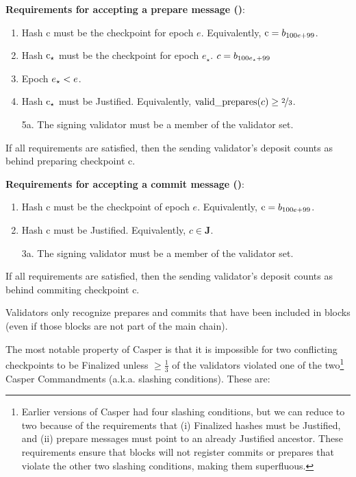 \documentclass[12pt]{article}
\newcommand{\epoch}{\ensuremath{e}\xspace}
\newcommand{\hash}{\textnormal{c}\xspace}
\newcommand{\epochsource}{\ensuremath{\epoch_{\star}}\space}
\newcommand{\hashsource}{\ensuremath{\hash_{\star}}\xspace}
\newcommand{\msgCOMMIT}{\textbf{\textsc{commit}}\xspace}
\begin{document}

\textbf{Requirements for accepting a prepare message ()}:
\begin{enumerate}
\item Hash \hash must be the checkpoint for epoch \epoch.  Equivalently, $\hash = b_{100\epoch + 99}$.
\item Hash \hashsource must be the checkpoint for epoch \epochsource.  $c = b_{100\epochsource + 99}$
\item Epoch $\epochsource < \epoch$.
\item Hash \hashsource must be Justified.  Equivalently, $\textnormal{valid\_prepares}(c) \geq \nicefrac{2}{3}$.
\item[5a.] The signing validator must be a member of the validator set.
\end{enumerate}
If all requirements are satisfied, then the sending validator's deposit counts as behind preparing checkpoint \hash.




\textbf{Requirements for accepting a commit message ()}:
\begin{enumerate}
\item Hash \hash must be the checkpoint of epoch \epoch.  Equivalently, $\hash = b_{100\epoch + 99}$.
\item Hash \hash must be Justified.  Equivalently, $c \in \mathbf{J}$.
\item[3a.] The signing validator must be a member of the validator set.
\end{enumerate}
If all requirements are satisfied, then the sending validator's deposit counts as behind commiting checkpoint \hash.

Validators only recognize prepares and commits that have been included in blocks (even if those blocks are not part of the main chain). 

The most notable property of Casper is that it is impossible for two conflicting checkpoints to be Finalized unless $\geq \frac{1}{3}$ of the validators violated one of the two\footnote{Earlier versions of Casper had four slashing conditions,\cite{minslashing} but we can reduce to two because of the requirements that (i) Finalized hashes must be Justified, and (ii) prepare messages must point to an already Justified ancestor.  These requirements ensure that blocks will not register commits or prepares that violate the other two slashing conditions, making them superfluous.} Casper Commandments (a.k.a. slashing conditions).  These are:
\end{document}
